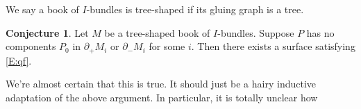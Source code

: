 \documentclass[12pt]{amsart}
\theoremstyle{definition}
\newtheorem{conj}[theorem]{Conjecture}
\newcommand{\bd}{\partial}
\begin{document}
We say a book of $I$-bundles is tree-shaped if its gluing graph is a tree.


\begin{conj}


Let $M$ be a tree-shaped book of $I$-bundles. Suppose $P$ has no components
$P_0$ in $\bd_+M_i$ or $\bd_-M_i$ for some $i$. Then there exists a surface
satisfying \eqref{E:qf}.

\end{conj}

We're almost certain that this is true. It should just be a hairy inductive
adaptation of the above argument. In particular, it is totally unclear how
\end{document}
